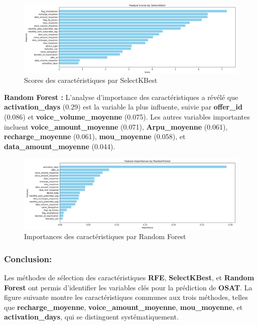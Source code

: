 \begin{figure}[H]
    \centering
    \includegraphics[width=1\linewidth]{capture_sas_66.png}
    \caption{Scores des caractéristiques par SelectKBest}
\end{figure}

\textbf{Random Forest :} L'analyse d'importance des caractéristiques a révélé que \textbf{activation\_days} (0.29) est la variable la plus influente, suivie par \textbf{offer\_id} (0.086) et \textbf{voice\_volume\_moyenne} (0.075). Les autres variables importantes incluent \textbf{voice\_amount\_moyenne} (0.071), \textbf{Arpu\_moyenne} (0.061), \textbf{recharge\_moyenne} (0.061), \textbf{mou\_moyenne} (0.058), et \textbf{data\_amount\_moyenne} (0.044).

\begin{figure}[H]
    \centering
    \includegraphics[width=1\linewidth]{capture_sas_67.png}
    \caption{Importances des caractéristiques par Random Forest}
\end{figure}


\subsubsection*{Conclusion:}
Les méthodes de sélection des caractéristiques \textbf{RFE}, \textbf{SelectKBest}, et \textbf{Random Forest} ont permis d'identifier les variables clés pour la prédiction de \textbf{OSAT}. La figure suivante montre les caractéristiques communes aux trois méthodes, telles que \textbf{recharge\_moyenne}, \textbf{voice\_amount\_moyenne}, \textbf{mou\_moyenne}, et \textbf{activation\_days}, qui se distinguent systématiquement.

